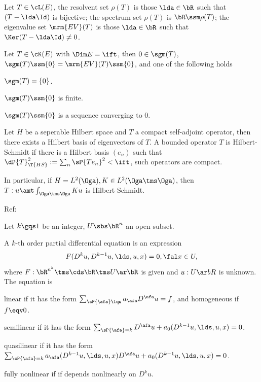 \documentclass[a4paper, twoside]{article}
\begin{document}
\begin{dfn}
    Let $T\in\cL(E)$, the resolvent set $\rho(T)$ is those $\lda\in\bR$ such that $(T-\lda \Id)$ is bijective; the spectrum set $\rho(T)$ is $\bR\ssm\rho(T)$; the eigenvalue set $\mrm{EV}(T)$ is those $\lda\in\bR$ such that $\Ker(T-\lda\Id)\neq 0$.
\end{dfn}

\begin{thm}[Theorem~6.8]
    Let $T\in\cK(E)$ with $\Dim E=\ift$, then $0\in\sgm(T)$, $\sgm(T)\ssm\{0\}=\mrm{EV}(T)\ssm\{0\}$, and one of the following holds
    \begin{itm}
        \item $\sgm(T)=\{0\}$.
        \item $\sgm(T)\ssm\{0\}$ is finite.
        \item $\sgm(T)\ssm\{0\}$ is a sequence converging to $0$.
    \end{itm}
\end{thm}

\begin{thm}
    Let $H$ be a seperable Hilbert space and $T$ a compact self-adjoint operator, then there exists a Hilbert basis of eigenvectors of $T$. A bounded operator $T$ is Hilbert-Schmidt if there is a Hilbert basis $(e_{n})$ such that $\dP{T}_{\T{HS}}^{2}:=\sum_{n}\sP{Te_{n}}^{2}<\ift$, such operators are compact.

    In particular, if $H=L^{2}(\Oga), K\in L^{2}(\Oga\tms\Oga)$, then $T:u\amt\int_{\Oga\tms\Oga}Ku$ is Hilbert-Schmidt.
\end{thm}



Ref:~\cite{Evans2010}

\begin{dfn}
    Let $k\gqs1$ be an integer, $U\sbs \bR^{n}$ an open subset.

    A $k$-th order partial differential equation is an expression
    \[
        F(D^{k}u,D^{k-1}u,\lds,u,x)=0, \fal x\in U,
    \]
    where $F:\bR^{n^{k}}\tms\cds \bR\tms U\ar\bR$ is given and $u:U\ar bR$ is unknown. The equation is
    \begin{enr}[label=(\arabic*)]
        \item linear if it has the form $\sum_{\sP{\afa}\lqs}a_{\afa}D^{\afa}u=f$, and homogeneous if $f\eqv0$.
        \item semilinear if it has the form $\sum_{\sP{\afa}=k}D^{\afa}u+a_{0}(D^{k-1}u,\lds,u,x)=0$.
        \item quasilinear if it has the form $\sum_{\sP{\afa}=k}a_{\afa}(D^{k-1}u,\lds,u,x)D^{\afa}u+a_{0}(D^{k-1}u,\lds,u,x)=0$.
        \item fully nonlinear if if depends nonlinearly on $D^{k}u$.
    \end{enr}
\end{dfn}
\end{document}
